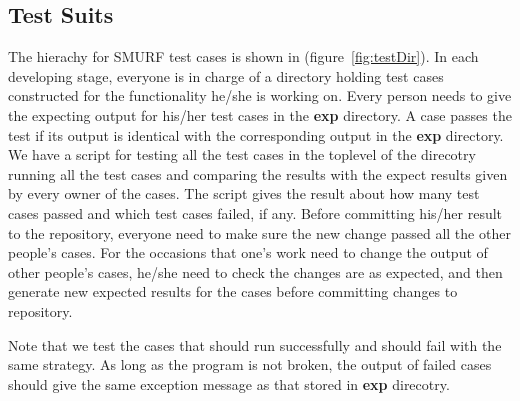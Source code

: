 \subsection{Test Suits}

The hierachy for SMURF test cases is shown in (figure~\ref{fig:testDir}). 
In each developing stage, everyone is in charge of a directory holding test cases constructed for the functionality he/she is working on. 
Every person needs to give the expecting output for his/her test cases in the {\bf exp} directory.
A case passes the test if its output is identical with the corresponding output in the {\bf exp} directory.
We have a script for testing all the test cases in the toplevel of the direcotry running all the test cases and comparing the results with the expect results given by every owner of the cases. 
The script gives the result about how many test cases passed and which test cases failed, if any. 
Before committing his/her result to the repository, everyone need to make sure the new change passed all the other people's cases. 
For the occasions that one's work need to change the output of other people's cases, 
he/she need to check the changes are as expected, 
and then generate new expected results for the cases before committing changes to repository.

Note that we test the cases that should run successfully and should fail with the same strategy. 
As long as the program is not broken, the output of failed cases should give the same exception message as that stored in {\bf exp} direcotry.

